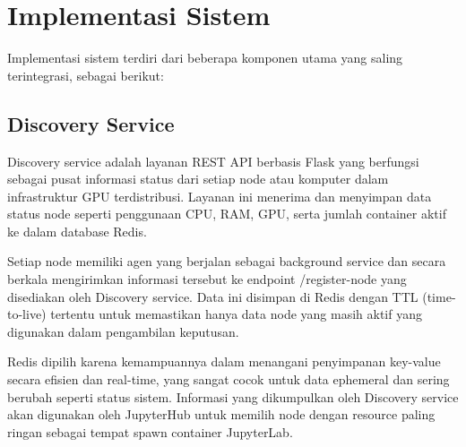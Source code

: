 \section{Implementasi Sistem
  \label{sec:implementasi sistem}}

Implementasi sistem terdiri dari beberapa komponen utama yang saling terintegrasi, sebagai berikut:
  

\subsection{Discovery Service}

Discovery service adalah layanan REST API berbasis Flask yang berfungsi sebagai pusat informasi status dari setiap node atau komputer dalam infrastruktur GPU terdistribusi. Layanan ini menerima dan menyimpan data status node seperti penggunaan CPU, RAM, GPU, serta jumlah container aktif ke dalam database Redis.

Setiap node memiliki agen yang berjalan sebagai background service dan secara berkala mengirimkan informasi tersebut ke endpoint /register-node yang disediakan oleh Discovery service. Data ini disimpan di Redis dengan TTL (time-to-live) tertentu untuk memastikan hanya data node yang masih aktif yang digunakan dalam pengambilan keputusan.

Redis dipilih karena kemampuannya dalam menangani penyimpanan key-value secara efisien dan real-time, yang sangat cocok untuk data ephemeral dan sering berubah seperti status sistem.
Informasi yang dikumpulkan oleh Discovery service akan digunakan oleh JupyterHub untuk memilih node dengan resource paling ringan sebagai tempat spawn container JupyterLab.

% 

% 

% 

% 


% 

% 
